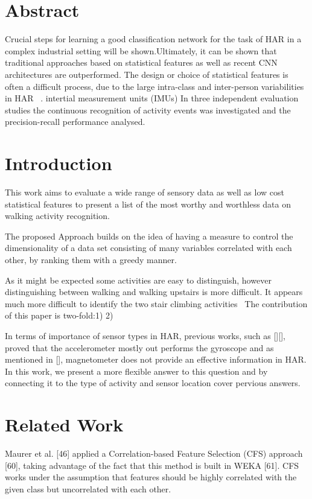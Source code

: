 \section{Abstract}

Crucial steps for learning a good classification network for the task of HAR in a complex industrial setting will be shown.Ultimately, it can be shown that traditional approaches based on statistical features as well as recent CNN architectures are outperformed.
The design or choice of statistical features is often a difficult process, due to the large intra-class and inter-person variabilities in HAR ~\cite{kreil2016coping}.
intertial measurement units (IMUs)
In three independent evaluation studies the continuous recognition of activity events was investigated and the precision-recall performance analysed.
\section{Introduction}
This work aims to evaluate a wide range of sensory data as well as low cost statistical features to present a list of the most worthy and worthless data on walking activity recognition.

The proposed Approach builds on the idea of having a measure to control the dimensionality of a data set consisting of many variables correlated with each other, by ranking them with a greedy manner.

As it might be expected some activities are easy to distinguish, however distinguishing between walking and walking upstairs is more difficult\cite{randell2000context}.
It appears much more difficult to identify the two stair climbing activities~\cite{kwapisz2011activity}
The contribution of this paper is two-fold:1) 2)

In terms of importance of sensor types in HAR, previous works, such as [][], proved that the accelerometer mostly out performs the gyroscope and as mentioned in [], magnetometer does not provide an effective information in HAR. In this work, we present a more flexible answer to this question and by connecting it to the type of activity and sensor location cover pervious answers.

\section{Related Work}
Maurer et al. [46] applied a Correlation-based Feature Selection (CFS) approach [60], taking advantage of the fact that this method is built in WEKA [61]. CFS works under the assumption that features should be highly correlated with the given class but uncorrelated with each other.

